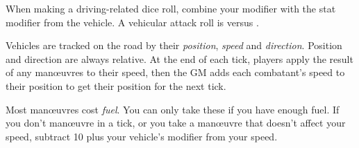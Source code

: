 
When making a driving-related dice roll, combine your  modifier with the stat modifier from the vehicle. A vehicular attack roll is  versus .

Vehicles are tracked on the road by their \emph{position}, \emph{speed} and \emph{direction}. Position and direction are always relative. At the end of each tick, players apply the result of any man\oe{}uvres to their speed, then the GM adds each combatant's speed to their position to get their position for the next tick.

Most man\oe{}uvres cost \emph{fuel}. You can only take these if you have enough fuel. If you don't man\oe{}uvre in a tick, or you take a man\oe{}uvre that doesn't affect your speed, subtract 10 plus your vehicle's  modifier from your speed.
